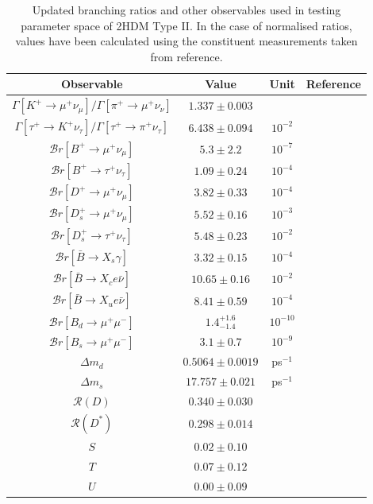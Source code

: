 \documentclass[a4paper,12pt]{article}
\begin{document}
\begin{table}[ht]
    \centering
    \begin{tabular}{c|ccc}
        \hline\hline
        Observable & Value & Unit & Reference \\
        \hline\hline
        $\Gamma[K^+\to\mu^+\nu_\mu]/\Gamma[\pi^+\to\mu^+\nu_\nu]$ & $1.337\pm0.003$ & & \cite{pdg}\\
        $\Gamma[\tau^+\to K^+\nu_\tau]/\Gamma[\tau^+\to\pi^+\nu_\tau]$ & $6.438\pm0.094$ & $10^{-2}$ & \cite{pdg} \\
        $\mathcal{B}r[B^+\to\mu^+\nu_\mu]$ & $5.3\pm2.2$ & $10^{-7}$ & \cite{bmu} \\
        $\mathcal{B}r[B^+\to\tau^+\nu_\tau]$ & $1.09\pm0.24$ & $10^{-4}$ & \cite{pdg} \\
        $\mathcal{B}r[D^+\to\mu^+\nu_\mu]$ & $3.82\pm0.33$ & $10^{-4}$ & \cite{pdg} \\
        $\mathcal{B}r[D_s^+\to\mu^+\nu_\mu]$ & $5.52\pm0.16$ & $10^{-3}$ & \cite{pdg} \\
        $\mathcal{B}r[D_s^+\to\tau^+\nu_\tau]$ & $5.48\pm0.23$ & $10^{-2}$ & \cite{pdg} \\
        $\mathcal{B}r[\bar{B}\to X_s\gamma]$ & $3.32\pm0.15$ & $10^{-4}$ & \cite{hflav} \\
        $\mathcal{B}r[\bar{B}\to X_c e\bar{\nu}]$ & $10.65\pm0.16$ & $10^{-2}$ & \cite{hflav,pdg} \\
        $\mathcal{B}r[\bar{B}\to X_ue\bar{\nu}]$ & $8.41\pm0.59$ & $10^{-4}$ & \cite{bxu} \\
        $\mathcal{B}r[B_d\to\mu^+\mu^-]$ & $1.4^{+1.6}_{-1.4}$ & $10^{-10}$ & \cite{pdg} \\
        $\mathcal{B}r[B_s\to\mu^+\mu^-]$ & $3.1\pm0.7$ & $10^{-9}$ & \cite{hflav} \\
        $\Delta m_d$ & $0.5064\pm0.0019$ & ps$^{-1}$ & \cite{hflav} \\ 
        $\Delta m_s$ & $17.757\pm0.021$ & ps$^{-1}$ & \cite{hflav} \\
        $\mathcal{R}(D)$ & $0.340\pm0.030$ & & \cite{hflav} \\
        $\mathcal{R}(D^*)$ & $0.298\pm0.014$ & & \cite{hflav} \\
        $S$ & $0.02\pm0.10$ & & \cite{pdg} \\
        $T$ & $0.07\pm0.12$ & & \cite{pdg} \\
        $U$ & $0.00\pm0.09$ & & \cite{pdg} \\
        \hline\hline
    \end{tabular}
    \caption{\label{tab:branches}Updated branching ratios and other observables used in testing parameter space of 2HDM Type II. In the case of normalised ratios, values have been calculated using the constituent measurements taken from reference.}
\end{table}
\end{document}
